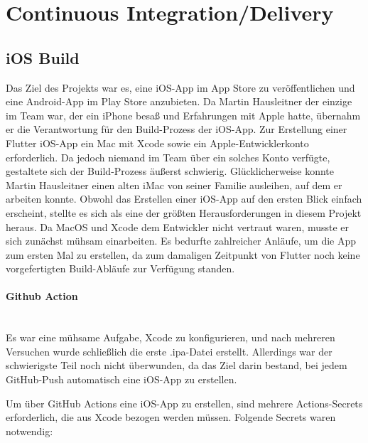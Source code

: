 \section{Continuous Integration/Delivery}

\subsection{iOS Build}

Das Ziel des Projekts war es, eine \cite{ios_app_store} iOS-App
im App Store zu veröffentlichen und eine Android-App im Play Store anzubieten. Da Martin Hausleitner der einzige im Team war, der ein iPhone besaß und Erfahrungen mit Apple hatte, übernahm er die Verantwortung für den Build-Prozess der iOS-App.
Zur Erstellung einer \cite{flutter} Flutter iOS-App ein Mac mit \cite{xcode} Xcode sowie ein \cite{apple_developer_program} Apple-Entwicklerkonto erforderlich. Da jedoch niemand im Team über ein solches Konto verfügte, gestaltete sich der Build-Prozess äußerst schwierig. Glücklicherweise konnte Martin Hausleitner einen alten iMac von seiner Familie ausleihen, auf dem er arbeiten konnte. Obwohl das Erstellen einer iOS-App auf den ersten Blick einfach erscheint, stellte es sich als eine der größten Herausforderungen in diesem Projekt heraus.
Da MacOS und Xcode dem Entwickler nicht vertraut waren, musste er sich zunächst mühsam einarbeiten. Es bedurfte zahlreicher Anläufe, um die App zum ersten Mal zu erstellen, da zum damaligen Zeitpunkt von Flutter noch keine vorgefertigten Build-Abläufe zur Verfügung standen.


\paragraph{Github Action}\mbox{} \\
Es war eine mühsame Aufgabe, Xcode zu konfigurieren, und
nach mehreren Versuchen wurde schließlich die erste
.ipa-Datei erstellt. Allerdings war der schwierigste Teil
noch nicht überwunden, da das Ziel darin bestand, bei jedem
GitHub-Push automatisch eine iOS-App zu erstellen.

Um über GitHub Actions eine iOS-App zu erstellen, sind
mehrere Actions-Secrets erforderlich, die aus Xcode bezogen
werden müssen. Folgende Secrets waren notwendig:

